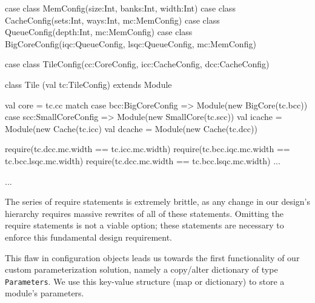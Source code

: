 \documentclass[10pt,twocolumn]{article}
\def\code#1{{\small\tt #1}}
\begin{document}
\begin{scala}
case class MemConfig(size:Int, banks:Int, width:Int)
case class CacheConfig(sets:Int, ways:Int, mc:MemConfig)
case class QueueConfig(depth:Int, mc:MemConfig)
case class BigCoreConfig(iqc:QueueConfig, lsqc:QueueConfig, mc:MemConfig)

case class TileConfig(cc:CoreConfig, icc:CacheConfig, dcc:CacheConfig)

class Tile (val tc:TileConfig) extends Module { 
  val core = tc.cc match {
    case bcc:BigCoreConfig => Module(new BigCore(tc.bcc))
    case scc:SmallCoreConfig => Module(new SmallCore(tc.scc))
  }
  val icache = Module(new Cache(tc.icc)
  val dcache = Module(new Cache(tc.dcc))
  
  require(tc.dcc.mc.width == tc.icc.mc.width)
  require(tc.bcc.iqc.mc.width == tc.bcc.lsqc.mc.width)
  require(tc.dcc.mc.width == tc.bcc.lsqc.mc.width)
  ...
}
...
\end{scala}

The series of require statements is extremely brittle, as any change in our design's hierarchy requires massive rewrites of all of these statements. Omitting the require statements is not a viable option; these statements are necessary to enforce this fundamental design requirement.

This flaw in configuration objects leads us towards the first functionality of our custom parameterization solution, namely a copy/alter dictionary of type \code{Parameters}. We use this key-value structure (map or dictionary) to store a module's parameters.
\end{document}
